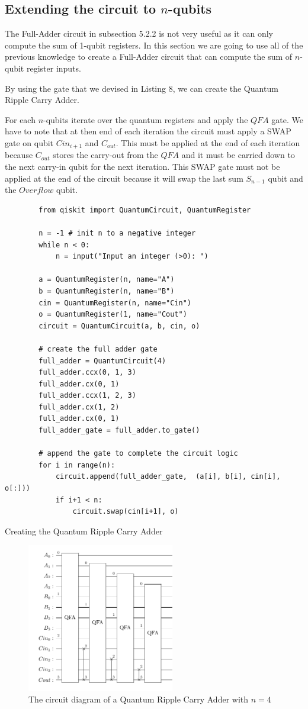 \subsection{Extending the circuit to $n$-qubits}

The Full-Adder circuit in subsection 5.2.2 is not very useful as it can only compute the sum of 1-qubit registers. In this section
we are going to use all of the previous knowledge to create a Full-Adder circuit that can compute the sum of $n$-qubit register inputs.

By using the gate that we devised in Listing 8, we can create the Quantum Ripple Carry Adder.

For each $n$-qubits iterate over the quantum registers and apply the $QFA$ gate. We have to note that at then end of each iteration
the circuit must apply a SWAP gate on qubit $Cin_{i+1}$ and $C_{out}$. This must be applied at the end of each iteration because
$C_{out}$ stores the carry-out from the $QFA$ and it must be carried down to the next carry-in qubit for the next iteration. This
SWAP gate must not be applied at the end of the circuit because it will swap the last sum $S_{n-1}$ qubit and the $Overflow$ qubit.

\begin{listing}[ht]
    \centering
    \begin{verbatim}
        from qiskit import QuantumCircuit, QuantumRegister

        n = -1 # init n to a negative integer
        while n < 0:
            n = input("Input an integer (>0): ")

        a = QuantumRegister(n, name="A")
        b = QuantumRegister(n, name="B")
        cin = QuantumRegister(n, name="Cin")
        o = QuantumRegister(1, name="Cout")
        circuit = QuantumCircuit(a, b, cin, o)

        # create the full adder gate
        full_adder = QuantumCircuit(4)
        full_adder.ccx(0, 1, 3)
        full_adder.cx(0, 1)
        full_adder.ccx(1, 2, 3)
        full_adder.cx(1, 2)
        full_adder.cx(0, 1)
        full_adder_gate = full_adder.to_gate()

        # append the gate to complete the circuit logic
        for i in range(n):
            circuit.append(full_adder_gate,  (a[i], b[i], cin[i], o[:]))
            if i+1 < n:
                circuit.swap(cin[i+1], o)
    \end{verbatim}
    \caption{Creating the Quantum Ripple Carry Adder}
\end{listing}

\begin{figure}[!ht]
    \centering
    \includegraphics[height=6.5cm]{images/5_Implementation/quantum_ripple_carry_adder.pdf}
    \caption{The circuit diagram of a Quantum Ripple Carry Adder with $n=4$}
\end{figure}
